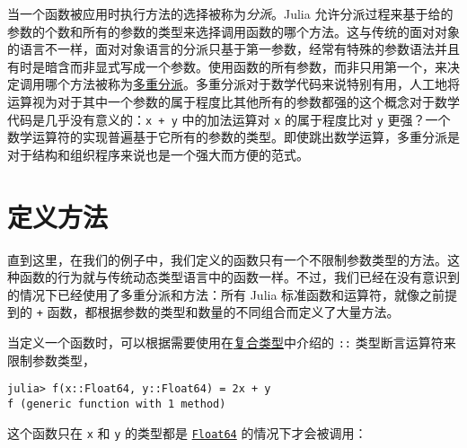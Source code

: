 当一个函数被应用时执行方法的选择被称为\emph{分派}。Julia 允许分派过程来基于给的参数的个数和所有的参数的类型来选择调用函数的哪个方法。这与传统的面对对象的语言不一样，面对对象语言的分派只基于第一参数，经常有特殊的参数语法并且有时是暗含而非显式写成一个参数。\footnotemark[1]使用函数的所有参数，而非只用第一个，来决定调用哪个方法被称为\href{https://en.wikipedia.org/wiki/Multiple\_dispatch}{多重分派}。多重分派对于数学代码来说特别有用，人工地将运算视为对于其中一个参数的属于程度比其他所有的参数都强的这个概念对于数学代码是几乎没有意义的：\texttt{x + y} 中的加法运算对 \texttt{x} 的属于程度比对 \texttt{y} 更强？一个数学运算符的实现普遍基于它所有的参数的类型。即使跳出数学运算，多重分派是对于结构和组织程序来说也是一个强大而方便的范式。





\hypertarget{17361934126771506898}{}


\section{定义方法}



直到这里，在我们的例子中，我们定义的函数只有一个不限制参数类型的方法。这种函数的行为就与传统动态类型语言中的函数一样。不过，我们已经在没有意识到的情况下已经使用了多重分派和方法：所有 Julia 标准函数和运算符，就像之前提到的 \texttt{+} 函数，都根据参数的类型和数量的不同组合而定义了大量方法。



当定义一个函数时，可以根据需要使用在\hyperlink{4168730090950432836}{复合类型}中介绍的 \texttt{::} 类型断言运算符来限制参数类型，




\begin{verbatim}
julia> f(x::Float64, y::Float64) = 2x + y
f (generic function with 1 method)
\end{verbatim}



这个函数只在 \texttt{x} 和 \texttt{y} 的类型都是 \hyperlink{5027751419500983000}{\texttt{Float64}} 的情况下才会被调用：




